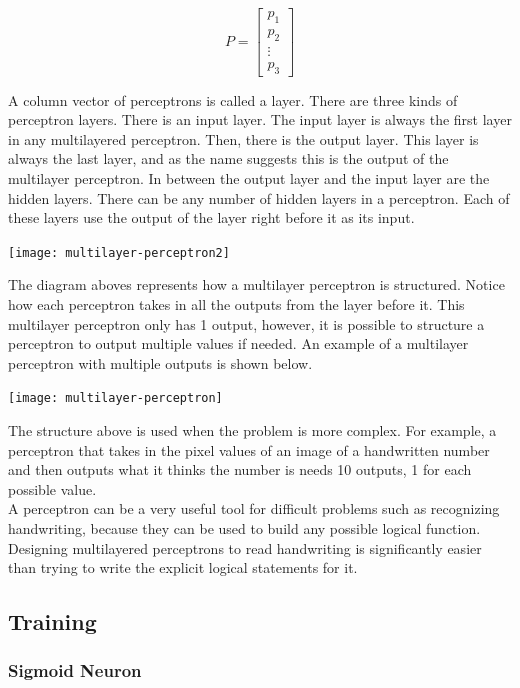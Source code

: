 $$
	P = \begin{bmatrix}
		p_1 \\
		p_2 \\
		\vdots \\
		p_3
	\end{bmatrix}
$$

A column vector of perceptrons is called a layer. There are three kinds of perceptron layers. There is an input layer. The input layer is always the first layer in any multilayered perceptron. Then, there is the output layer. This layer is always the last layer, and as the name suggests this is the output of the multilayer perceptron. In between the output layer and the input layer are the hidden layers. There can be any number of hidden layers in a perceptron. Each of these layers use the output of the layer right before it as its input.

\begin{center}
	\texttt{[image: multilayer-perceptron2]}
\end{center}

The diagram aboves represents how a multilayer perceptron is structured. Notice how each perceptron takes in all the outputs from the layer before it. This multilayer perceptron only has 1 output, however, it is possible to structure a perceptron to output multiple values if needed. An example of a multilayer perceptron with multiple outputs is shown below.

\begin{center}
	\texttt{[image: multilayer-perceptron]}
\end{center}

The structure above is used when the problem is more complex. For example, a perceptron that takes in the pixel values of an image of a handwritten number and then outputs what it thinks the number is needs 10 outputs, 1 for each possible value. \\

A perceptron can be a very useful tool for difficult problems such as recognizing handwriting, because they can be used to build any possible logical function. Designing multilayered perceptrons to read handwriting is significantly easier than trying to write the explicit logical statements for it.

\subsection{Training}

\subsubsection{Sigmoid Neuron}

